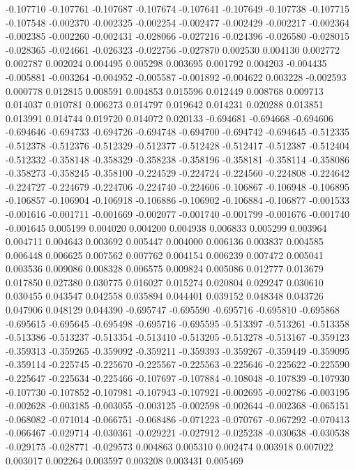 -0.107710
-0.107761
-0.107687
-0.107674
-0.107641
-0.107649
-0.107738
-0.107715
-0.107548
-0.002370
-0.002325
-0.002254
-0.002477
-0.002429
-0.002217
-0.002364
-0.002385
-0.002260
-0.002431
-0.028066
-0.027216
-0.024396
-0.026580
-0.028015
-0.028365
-0.024661
-0.026323
-0.022756
-0.027870
0.002530
0.004130
0.002772
0.002787
0.002024
0.004495
0.005298
0.003695
0.001792
0.004203
-0.004435
-0.005881
-0.003264
-0.004952
-0.005587
-0.001892
-0.004622
0.003228
-0.002593
0.000778
0.012815
0.008591
0.004853
0.015596
0.012449
0.008768
0.009713
0.014037
0.010781
0.006273
0.014797
0.019642
0.014231
0.020288
0.013851
0.013991
0.014744
0.019720
0.014072
0.020133
-0.694681
-0.694668
-0.694606
-0.694646
-0.694733
-0.694726
-0.694748
-0.694700
-0.694742
-0.694645
-0.512335
-0.512378
-0.512376
-0.512329
-0.512377
-0.512428
-0.512417
-0.512387
-0.512404
-0.512332
-0.358148
-0.358329
-0.358238
-0.358196
-0.358181
-0.358114
-0.358086
-0.358273
-0.358245
-0.358100
-0.224529
-0.224724
-0.224560
-0.224808
-0.224642
-0.224727
-0.224679
-0.224706
-0.224740
-0.224606
-0.106867
-0.106948
-0.106895
-0.106857
-0.106904
-0.106918
-0.106886
-0.106902
-0.106884
-0.106877
-0.001533
-0.001616
-0.001711
-0.001669
-0.002077
-0.001740
-0.001799
-0.001676
-0.001740
-0.001645
0.005199
0.004020
0.004200
0.004938
0.006833
0.005299
0.003964
0.004711
0.004643
0.003692
0.005447
0.004000
0.006136
0.003837
0.004585
0.006448
0.006625
0.007562
0.007762
0.004154
0.006239
0.007472
0.005041
0.003536
0.009086
0.008328
0.006575
0.009824
0.005086
0.012777
0.013679
0.017850
0.027380
0.030775
0.016027
0.015274
0.020804
0.029247
0.030610
0.030455
0.043547
0.042558
0.035894
0.044401
0.039152
0.048348
0.043726
0.047906
0.048129
0.044390
-0.695747
-0.695590
-0.695716
-0.695810
-0.695868
-0.695615
-0.695645
-0.695498
-0.695716
-0.695595
-0.513397
-0.513261
-0.513358
-0.513386
-0.513237
-0.513354
-0.513410
-0.513205
-0.513278
-0.513167
-0.359123
-0.359313
-0.359265
-0.359092
-0.359211
-0.359393
-0.359267
-0.359449
-0.359095
-0.359114
-0.225745
-0.225670
-0.225567
-0.225563
-0.225646
-0.225622
-0.225590
-0.225647
-0.225634
-0.225466
-0.107697
-0.107884
-0.108048
-0.107839
-0.107930
-0.107730
-0.107852
-0.107981
-0.107943
-0.107921
-0.002695
-0.002786
-0.003195
-0.002628
-0.003185
-0.003055
-0.003125
-0.002598
-0.002644
-0.002368
-0.065151
-0.068082
-0.071014
-0.066751
-0.068486
-0.071223
-0.070767
-0.067292
-0.070413
-0.066467
-0.029714
-0.030361
-0.029221
-0.027912
-0.025238
-0.030638
-0.030538
-0.029175
-0.028771
-0.029573
0.004863
0.005310
0.002474
0.003918
0.007022
0.003017
0.002264
0.003597
0.003208
0.003431
0.005469
